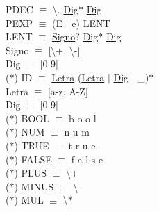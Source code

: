 \documentclass[\main/MemoriaPL.tex]{subfiles}
\begin{document}
      \hspace{10mm} PDEC $\equiv$ \textbackslash. \underline{Dig}$\ast$ \underline{Dig} \\
      \hspace{10mm} PEXP $\equiv$ (E $\mid$ e) \underline{LENT} \\
      \vspace{2mm}
      \hspace{10mm} LENT $\equiv$ \underline{Signo}? \underline{Dig}$\ast$ \underline{Dig} \\
      \hspace{10mm} Signo $\equiv$ [\textbackslash+, \textbackslash-] \\
      \hspace{10mm} Dig   $\equiv$ [0-9] \\
      \vspace{2mm}
    \hspace{5mm}($\ast$) ID $\equiv$ \underline{Letra} (\underline{Letra} $\mid$ \underline{Dig} $\mid$ \_)$\ast$ \\
      \hspace{10mm} Letra $\equiv$ [a-z, A-Z] \\
      \hspace{10mm} Dig $\equiv$ [0-9] \\
    \vspace{2mm}
      \hspace{5mm}($\ast$) BOOL $\equiv$ b o o l \\
    \vspace{2mm}
    \hspace{5mm}($\ast$) NUM $\equiv$ n u m \\
    \vspace{2mm}
    \hspace{5mm}($\ast$) TRUE $\equiv$ t r u e \\
    \vspace{2mm}
    \hspace{5mm}($\ast$) FALSE $\equiv$ f a l s e \\
    \vspace{2mm}
    \hspace{5mm}($\ast$) PLUS $\equiv$ \textbackslash + \\
    \vspace{2mm}
    \hspace{5mm}($\ast$) MINUS $\equiv$ \textbackslash - \\
    \vspace{2mm}
    \hspace{5mm}($\ast$) MUL $\equiv$ \textbackslash $\ast$ \\
\end{document}
